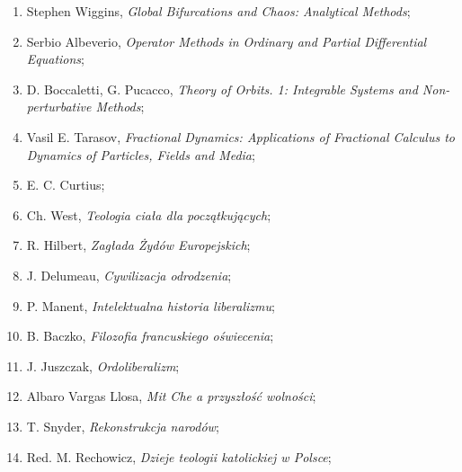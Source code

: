 \documentclass[a4paper,11pt]{article}
\begin{document}
\begin{enumerate}
\item Stephen Wiggins, \textit{Global Bifurcations and Chaos: Analytical
    Methods};



\item Serbio Albeverio, \textit{Operator Methods in Ordinary and Partial
    Differential Equations};



\item D. Boccaletti, G. Pucacco, \textit{Theory of Orbits. 1: Integrable
    Systems and Non-perturbative Methods};



\item Vasil E. Tarasov, \textit{Fractional Dynamics: Applications of
    Fractional Calculus to Dynamics of Particles, Fields and Media};



\item E. C. Curtius;



\item Ch. West, \textit{Teologia ciała dla początkujących};



\item R. Hilbert, \textit{Zagłada Żydów Europejskich};



\item J. Delumeau, \textit{Cywilizacja odrodzenia};



\item P. Manent, \textit{Intelektualna historia liberalizmu};



\item B. Baczko, \textit{Filozofia francuskiego oświecenia};



\item J. Juszczak, \textit{Ordoliberalizm};



\item Albaro Vargas Llosa, \textit{Mit Che a przyszłość wolności};



\item T. Snyder, \textit{Rekonstrukcja narodów};



\item Red. M. Rechowicz, \textit{Dzieje teologii katolickiej w Polsce};




\end{enumerate}
\end{document}
